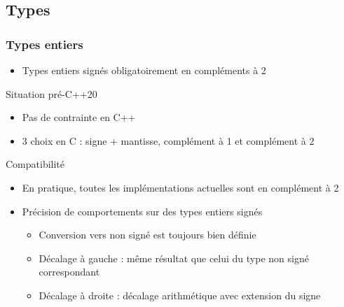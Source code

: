 \documentclass[C++.tex]{subfiles}
\begin{document}
\subsection*{Types}
\begin{frame}[fragile]
	\frametitle{Types entiers}
	\begin{itemize}
		\item Types entiers signés obligatoirement en compléments à 2
	\end{itemize}

	\begin{block}{Situation pré-C++20}
		\begin{itemize}
			\item Pas de contrainte en C++
			\item 3 choix en C : signe + mantisse, complément à 1 et complément à 2
		\end{itemize}
	\end{block}


	\begin{alertblock}{Compatibilité}
		\begin{itemize}
			\item En pratique, toutes les implémentations actuelles sont en complément à 2
		\end{itemize}
	\end{alertblock}

	\begin{itemize}
		\item Précision de comportements sur des types entiers signés
		\begin{itemize}
			\item Conversion vers non signé est toujours bien définie


			\item Décalage à gauche : même résultat que celui du type non signé correspondant
			\item Décalage à droite : décalage arithmétique avec extension du signe
		\end{itemize}
	\end{itemize}

\end{frame}
\end{document}
